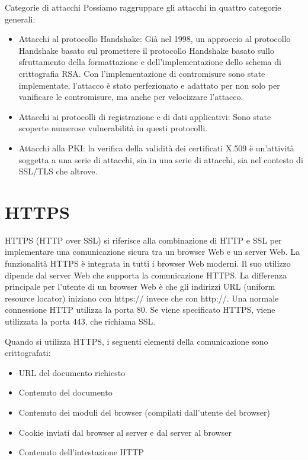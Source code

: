 \singlespacing

Categorie di attacchi Possiamo raggruppare gli attacchi in quattro categorie generali:

\begin{itemize}
    \item Attacchi al protocollo Handshake: Già nel 1998, un approccio al protocollo Handshake basato sul promettere il protocollo Handshake basato sullo sfruttamento della formattazione e dell'implementazione dello schema di crittografia RSA. Con l'implementazione di contromisure sono state implementate, l'attacco è stato perfezionato e adattato per non solo per vanificare le contromisure, ma anche per velocizzare l'attacco.
    
    \item Attacchi ai protocolli di registrazione e di dati applicativi: Sono state scoperte numerose vulnerabilità in questi protocolli.
    
    \item Attacchi alla PKI: la verifica della validità dei certificati X.509 è un'attività soggetta a una serie di attacchi, sia in una serie di attacchi, sia nel contesto di SSL/TLS che altrove.
\end{itemize}
\section{HTTPS}
HTTPS (HTTP over SSL) si riferisce alla combinazione di HTTP e SSL per implementare una comunicazione sicura tra un browser Web e un server Web. La funzionalità HTTPS è integrata in tutti i browser Web moderni. Il suo utilizzo dipende dal server Web che supporta la comunicazione HTTPS. La differenza principale per l'utente di un browser Web è che gli indirizzi URL (uniform resource locator) iniziano con https:// invece che con http://. Una normale connessione HTTP
utilizza la porta 80. Se viene specificato HTTPS, viene utilizzata la porta 443, che richiama SSL.

\singlespacing

Quando si utilizza HTTPS, i seguenti elementi della comunicazione sono crittografati:

\begin{itemize}
    \item URL del documento richiesto
    
    \item Contenuto del documento
    
    \item Contenuto dei moduli del browser (compilati dall'utente del browser)
    
    \item  Cookie inviati dal browser al server e dal server al browser
    
    \item  Contenuto dell'intestazione HTTP
\end{itemize}

